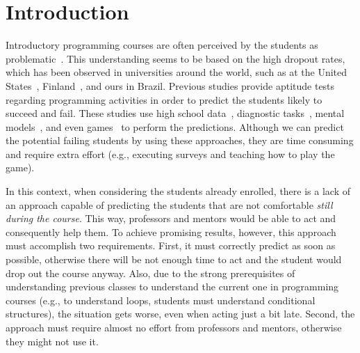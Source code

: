 
\section{Introduction}

Introductory programming courses are often perceived by the students as problematic~\cite{yadin-inroads-acm-11}. This understanding seems to be based on the high dropout rates, which has been observed in universities around the world, such as at the United States~\cite{bennedsen-sigcse-failure-rates-2007}, Finland~\cite{why-dropout-icer06}, and ours in Brazil. Previous studies provide aptitude tests regarding programming activities in order to predict the students likely to succeed and fail. These studies use high school data~\cite{butcher-predictor-high-school-1985}, diagnostic tasks~\cite{simon-predictors-ace2006}, mental models~\cite{camel-2006}, and even games~\cite{lorenzenC06-mastermind-predictor-sigcse2008} to perform the predictions. Although we can predict the potential failing students by using these approaches, they are time consuming and require extra effort (e.g., executing surveys and teaching how to play the game).

In this context, when considering the students already enrolled, there is a lack of an approach capable of predicting the students that are not comfortable \textit{still during the course}. This way, professors and mentors would be able to act and consequently help them. To achieve promising results, however, this approach must accomplish two requirements. First, it must correctly predict as soon as possible, otherwise there will be not enough time to act and the student would drop out the course anyway. Also, due to the strong prerequisites of understanding previous classes to understand the current one in programming courses (e.g., to understand loops, students must understand conditional structures), the situation gets worse, even when acting just a bit late. Second, the approach must require almost no effort from professors and mentors, otherwise they might not use it.



